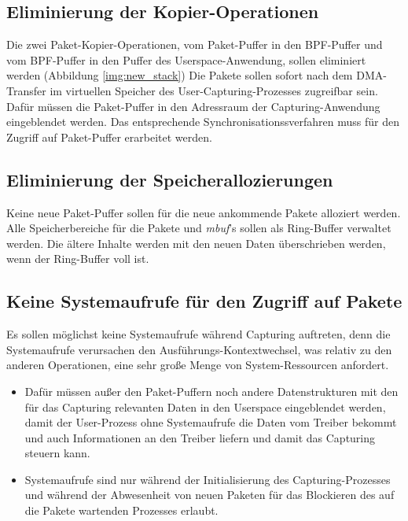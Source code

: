 \subsection{Eliminierung der Kopier-Operationen}
Die zwei Paket-Kopier-Operationen, vom Paket-Puffer in den BPF-Puffer und vom
BPF-Puffer in den Puffer des Userspace-Anwendung, sollen eliminiert werden
(Abbildung \ref{img:new_stack}) Die Pakete sollen sofort nach dem DMA-Transfer
im virtuellen Speicher des User-Capturing-Prozesses zugreifbar sein. Dafür
müssen die Paket-Puffer in den Adressraum der Capturing-Anwendung eingeblendet
werden. Das entsprechende Synchronisationssverfahren muss für den Zugriff auf 
Paket-Puffer erarbeitet werden.
%
\subsection{Eliminierung der Speicherallozierungen}
Keine neue Paket-Puffer sollen für die neue ankommende Pakete alloziert werden. 
Alle Speicherbereiche für die Pakete und \emph{mbuf}'s sollen als Ring-Buffer 
verwaltet werden. Die ältere Inhalte werden mit den neuen Daten überschrieben 
werden, wenn der Ring-Buffer voll ist. 

\subsection{Keine Systemaufrufe für den Zugriff auf Pakete}
Es sollen möglichst keine Systemaufrufe während Capturing auftreten, denn die
Systemaufrufe verursachen den Ausführungs-Kontextwechsel, was relativ zu den
anderen Operationen, eine sehr große Menge von System-Ressourcen anfordert.
		\begin{itemize}
			\item Dafür müssen außer den Paket-Puffern noch andere
				Datenstrukturen mit den für das Capturing relevanten Daten in den
				Userspace eingeblendet werden, damit der User-Prozess ohne
				Systemaufrufe die Daten vom Treiber bekommt und auch
				Informationen an den Treiber liefern und damit das Capturing
				steuern kann.
			\item   Systemaufrufe sind nur während der Initialisierung des
				Capturing-Prozesses 
				und während der Abwesenheit von neuen
				Paketen für das Blockieren des auf die Pakete wartenden
				Prozesses erlaubt. 
		\end{itemize}

